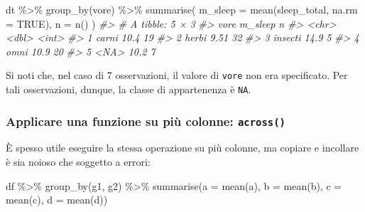 \documentclass[
  10pt,
  italian,
  a4paper,
  extrafontsizes,onecolumn,openright
  ]{memoir}
\newenvironment{Shaded}{\begin{snugshade}}{\end{snugshade}}
\newcommand{\AttributeTok}[1]{\textcolor[rgb]{0.77,0.63,0.00}{#1}}
\newcommand{\CommentTok}[1]{\textcolor[rgb]{0.56,0.35,0.01}{\textit{#1}}}
\newcommand{\ConstantTok}[1]{\textcolor[rgb]{0.00,0.00,0.00}{#1}}
\newcommand{\FunctionTok}[1]{\textcolor[rgb]{0.00,0.00,0.00}{#1}}
\newcommand{\NormalTok}[1]{#1}
\newcommand{\SpecialCharTok}[1]{\textcolor[rgb]{0.00,0.00,0.00}{#1}}
\begin{document}
\begin{Shaded}
\begin{Highlighting}[]
\NormalTok{dt }\SpecialCharTok{\%\textgreater{}\%}
  \FunctionTok{group\_by}\NormalTok{(vore) }\SpecialCharTok{\%\textgreater{}\%}
  \FunctionTok{summarise}\NormalTok{(}
    \AttributeTok{m\_sleep =} \FunctionTok{mean}\NormalTok{(sleep\_total, }\AttributeTok{na.rm =} \ConstantTok{TRUE}\NormalTok{), }
    \AttributeTok{n =} \FunctionTok{n}\NormalTok{()}
\NormalTok{  )}
\CommentTok{\#\textgreater{} \# A tibble: 5 × 3}
\CommentTok{\#\textgreater{}   vore    m\_sleep     n}
\CommentTok{\#\textgreater{}   \textless{}chr\textgreater{}     \textless{}dbl\textgreater{} \textless{}int\textgreater{}}
\CommentTok{\#\textgreater{} 1 carni     10.4     19}
\CommentTok{\#\textgreater{} 2 herbi      9.51    32}
\CommentTok{\#\textgreater{} 3 insecti   14.9      5}
\CommentTok{\#\textgreater{} 4 omni      10.9     20}
\CommentTok{\#\textgreater{} 5 \textless{}NA\textgreater{}      10.2      7}
\end{Highlighting}
\end{Shaded}

\noindent
Si noti che, nel caso di 7 osservazioni, il valore di \texttt{vore} non era
specificato. Per tali osservazioni, dunque, la classe di appartenenza è
\texttt{NA}.

\hypertarget{applicare-una-funzione-su-piuxf9-colonne-across}{%
\subsubsection{\texorpdfstring{Applicare una funzione su più colonne: \texttt{across()}}{Applicare una funzione su più colonne: across()}}\label{applicare-una-funzione-su-piuxf9-colonne-across}}

È spesso utile eseguire la stessa operazione su più colonne, ma copiare e incollare è sia noioso che soggetto a errori:

\begin{Shaded}
\begin{Highlighting}[]
\NormalTok{df }\SpecialCharTok{\%\textgreater{}\%} 
  \FunctionTok{group\_by}\NormalTok{(g1, g2) }\SpecialCharTok{\%\textgreater{}\%} 
  \FunctionTok{summarise}\NormalTok{(}\AttributeTok{a =} \FunctionTok{mean}\NormalTok{(a), }\AttributeTok{b =} \FunctionTok{mean}\NormalTok{(b), }\AttributeTok{c =} \FunctionTok{mean}\NormalTok{(c), }\AttributeTok{d =} \FunctionTok{mean}\NormalTok{(d))}
\end{Highlighting}
\end{Shaded}
\end{document}
